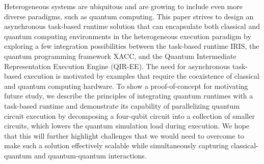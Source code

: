 Heterogeneous systems are ubiquitous and are growing to include even more diverse paradigms, such as quantum computing. This paper strives to design an asynchronous task-based runtime solution that can encapsulate both classical and quantum computing environments in the heterogeneous execution paradigm by exploring a few integration possibilities between the task-based runtime IRIS, the quantum programming framework XACC, and the Quantum Intermediate Representation Execution Engine (QIR-EE). The need for asynchronous task-based execution is motivated by examples that require the coexistence of classical and quantum computing hardware. To show a proof-of-concept for motivating future study, we describe the principles of integrating quantum runtimes with a task-based runtime and demonstrate its capability of parallelizing quantum circuit execution by decomposing a four-qubit circuit into a collection of smaller circuits, which lowers the quantum simulation load during execution. We hope that this will further highlight challenges that we would need to overcome to make such a solution effectively scalable while simultaneously capturing classical-quantum and quantum-quantum interactions.
